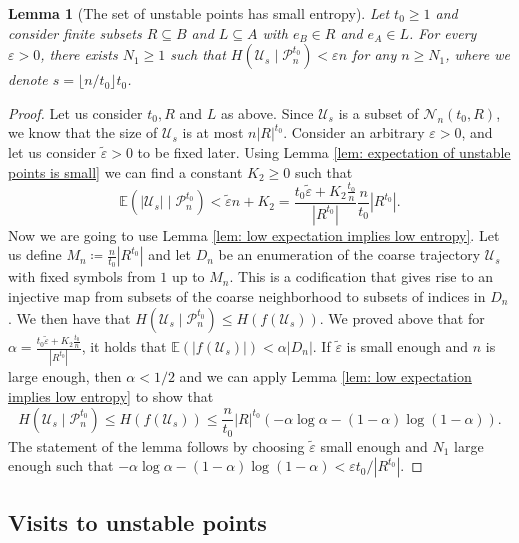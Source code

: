 \documentclass[reqno,oneside,11pt]{amsart}
\newcommand{\E}{\mathbb{E}}
\theoremstyle{plain}
\newtheorem{lem}[thm]{Lemma}
\theoremstyle{definition}
\begin{document}
\begin{lem}[The set of unstable points has small entropy]\label{lem: unstable points have small entropy}
	Let $t_0\ge 1$ and consider finite subsets $R\subseteq B$ and $L\subseteq A$ with $e_B\in R$ and $e_A\in L$. For every $\varepsilon>0$, there exists $N_1\ge 1$ such that $H(\mathcal{U}_s\mid \mathcal{P}_n^{t_0})<\varepsilon n$ for any $n\ge N_1$, where we denote $s=\lfloor n/t_0\rfloor t_0$.
\end{lem}
\begin{proof}
	Let us consider $t_0, R$ and $L$ as above. Since $\mathcal{U}_s$ is a subset of $\mathcal{N}_n(t_0,R)$, we know that the size of $\mathcal{U}_s$ is at most $n|R|^{t_0}$.  Consider an arbitrary $\varepsilon >0$, and let us consider $\widetilde{\varepsilon}>0$ to be fixed later. Using Lemma \ref{lem: expectation of unstable points is small} we can find a constant $K_2\ge 0$ such that 
	\begin{equation*}
		\E\left(|\mathcal{U}_s| \mid \mathcal{P}_n^{t_0}\right)<\widetilde{\varepsilon}n+ K_2=\frac{t_0\widetilde{\varepsilon} +K_2\frac{t_0}{n}}{|R^{t_0}|} \frac{n}{t_0}|R^{t_0}|.
	\end{equation*}
	Now we are going to use Lemma \ref{lem: low expectation implies low entropy}. Let us define $M_n\coloneqq \frac{n}{t_0}|R^{t_0}|$ and let $D_n$ be an enumeration of the coarse trajectory $ \mathcal{U}_s $ with fixed symbols from $1$ up to $M_n$. This is a codification that gives rise to an injective map from subsets of the coarse neighborhood to subsets of indices in $D_n$. We then have that $H(\mathcal{U}_s\mid \mathcal{P}_n^{t_0})\le H(f(\mathcal{U}_s))$. We proved above that for $\alpha=\frac{t_0\widetilde{\varepsilon} +K_2\frac{t_0}{n}}{|R^{t_0}|}$, it holds that $\E(|f(\mathcal{U}_s)|)<\alpha |D_n|$. If $\widetilde{\varepsilon}$ is small enough and $n$ is large enough, then $\alpha<1/2$ and we can apply Lemma \ref{lem: low expectation implies low entropy} to show that
	\begin{equation*}
		H\left(\mathcal{U}_s\mid \mathcal{P}_n^{t_0}\right)\le  H(f(\mathcal{U}_s))\le  \frac{n}{t_0}|R|^{t_0} (-\alpha \log \alpha - (1-\alpha)\log (1-\alpha) ).
	\end{equation*}
	The statement of the lemma follows by choosing $\widetilde{\varepsilon}$ small enough and $N_1$ large enough such that $-\alpha \log \alpha - (1-\alpha)\log (1-\alpha) <\varepsilon t_0/|R^{t_0}|$.
\end{proof}


\subsection{Visits to unstable points}\label{subsection: visits to unstable points}
\end{document}
